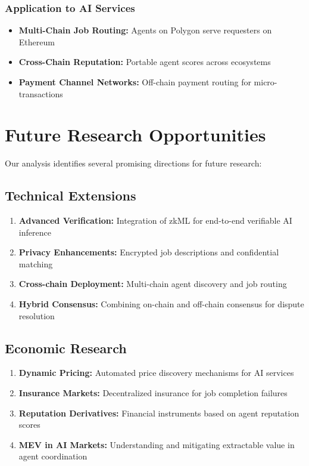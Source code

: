 \subsubsection{Application to AI Services}
\begin{itemize}
    \item \textbf{Multi-Chain Job Routing:} Agents on Polygon serve requesters on Ethereum
    \item \textbf{Cross-Chain Reputation:} Portable agent scores across ecosystems
    \item \textbf{Payment Channel Networks:} Off-chain payment routing for micro-transactions
\end{itemize}

\section{Future Research Opportunities}

Our analysis identifies several promising directions for future research:

\subsection{Technical Extensions}
\begin{enumerate}
    \item \textbf{Advanced Verification:} Integration of zkML for end-to-end verifiable AI inference
    \item \textbf{Privacy Enhancements:} Encrypted job descriptions and confidential matching
    \item \textbf{Cross-chain Deployment:} Multi-chain agent discovery and job routing
    \item \textbf{Hybrid Consensus:} Combining on-chain and off-chain consensus for dispute resolution
\end{enumerate}

\subsection{Economic Research}
\begin{enumerate}
    \item \textbf{Dynamic Pricing:} Automated price discovery mechanisms for AI services
    \item \textbf{Insurance Markets:} Decentralized insurance for job completion failures
    \item \textbf{Reputation Derivatives:} Financial instruments based on agent reputation scores
    \item \textbf{MEV in AI Markets:} Understanding and mitigating extractable value in agent coordination
\end{enumerate}

